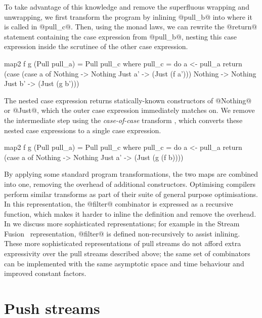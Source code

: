 To take advantage of this knowledge and remove the superfluous wrapping and unwrapping, we first transform the program by inlining @pull_b@ into where it is called in @pull_c@.
Then, using the monad laws, we can rewrite the @return@ statement containing the case expression from @pull_b@, nesting this case expression inside the scrutinee of the other case expression.

\begin{haskell}
map2 f g (Pull pull_a) = Pull pull_c
 where
  pull_c = do
    a <- pull_a
    return (case (case a of
                   Nothing -> Nothing
                   Just a' -> (Just (f a')))
             Nothing -> Nothing
             Just b' -> (Just (g b')))
\end{haskell}

The nested case expression returns statically-known constructors of @Nothing@ or @Just@, which the outer case expression immediately matches on.
We remove the intermediate step using the \emph{case-of-case} transform \cite{jones1998transformation}, which converts these nested case expressions to a single case expression.


\begin{haskell}
map2 f g (Pull pull_a) = Pull pull_c
 where
  pull_c = do
    a <- pull_a
    return (case a of
             Nothing -> Nothing
             Just a' -> (Just (g (f b))))
\end{haskell}

By applying some standard program transformations, the two maps are combined into one, removing the overhead of additional constructors.
Optimising compilers perform similar transforms as part of their suite of general purpose optimisations.
In this representation, the @filter@ combinator is expressed as a recursive function, which makes it harder to inline the definition and remove the overhead.
In  we discuss more sophisticated representations; for example in the Stream Fusion~\cite{coutts2007stream} representation, @filter@ is defined non-recursively to assist inlining.
These more sophisticated representations of pull streams do not afford extra expressivity over the pull streams described above; the same set of combinators can be implemented with the same asymptotic space and time behaviour and improved constant factors.



\section{Push streams}
\label{taxonomy/push}


